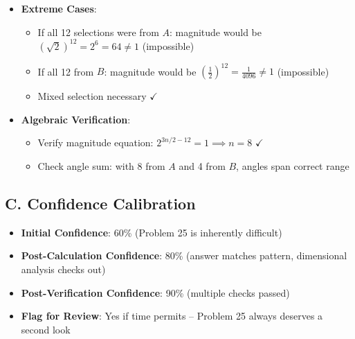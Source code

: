\documentclass[]{article}
\begin{document}
\begin{verificationbox}
\begin{itemize}[leftmargin=*]
\begin{itemize}
    \end{itemize}
    \item \textbf{Extreme Cases}:
    \begin{itemize}
        \item If all 12 selections were from $A$: magnitude would be $(\sqrt{2})^{12} = 2^6 = 64 \neq 1$ (impossible)
        \item If all 12 from $B$: magnitude would be $(\frac{1}{2})^{12} = \frac{1}{4096} \neq 1$ (impossible)
        \item Mixed selection necessary $\checkmark$
    \end{itemize}
    \item \textbf{Algebraic Verification}: 
    \begin{itemize}
        \item Verify magnitude equation: $2^{3n/2 - 12} = 1 \implies n = 8$ $\checkmark$
        \item Check angle sum: with 8 from $A$ and 4 from $B$, angles span correct range
    \end{itemize}
\end{itemize}

\subsection*{C. Confidence Calibration}
\begin{itemize}[leftmargin=*]
    \item \textbf{Initial Confidence}: 60\% (Problem 25 is inherently difficult)
    \item \textbf{Post-Calculation Confidence}: 80\% (answer matches pattern, dimensional analysis checks out)
    \item \textbf{Post-Verification Confidence}: 90\% (multiple checks passed)
    \item \textbf{Flag for Review}: Yes if time permits -- Problem 25 always deserves a second look
\end{itemize}
\end{verificationbox}
\end{document}
